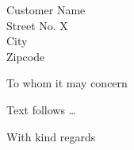 \documentclass[fontsize=12pt, paper=a4]{scrlttr2}
\begin{document}
\begin{letter}{Customer Name\\ Street No. X \\ City \\ Zipcode}

\opening{To whom it may concern}  %

Text follows \ldots
\bigskip

\closing{With kind regards} %

\end{letter}
\end{document}
